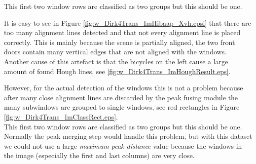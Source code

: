 This first two window rows are classified as two groups but this should be one.\\











It is easy to see in Figure \ref{fig:w_Dirk4Trans_ImHibaap_Xvh.epsi} that there are 
too many alignment lines detected and that not every alignment line is placed correctly. 
This is mainly because the scene is partially aligned, the two
front doors contain many vertical edges that are not aligned with the windows.
Another cause of this artefact is that the bicycles on the left cause a large
amount of found Hough lines, see \ref{fig:w_Dirk4Trans_ImHoughResult.eps}.
 
However, for the actual detection of the windows this is not a problem because
after many close alignment lines are discarded by the peak fusing module the
many subwindows are grouped to single windows, see red rectangles in Figure
\ref{fig:w_Dirk4Trans_ImClassRect.eps}.\\


This first two window rows are classified as two groups but this should be one.
Normally the peak merging step would handle this problem, but with this dataset
we could not use a large \emph{maximum peak distance} value because the windows
in the image (especially the first and last columns) are very close.



